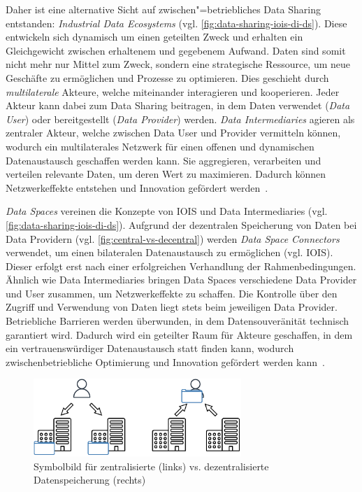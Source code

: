 Daher ist eine alternative Sicht auf zwischen"=betriebliches Data Sharing entstanden: \emph{Industrial Data Ecosystems} (vgl. \autoref{fig:data-sharing-iois-di-ds}).
Diese entwickeln sich dynamisch um einen geteilten Zweck und erhalten ein Gleichgewicht zwischen erhaltenem und gegebenem Aufwand.
Daten sind somit nicht mehr nur Mittel zum Zweck, sondern eine strategische Ressource, um neue Geschäfte zu ermöglichen und Prozesse zu optimieren.
Dies geschieht durch \emph{multilaterale} Akteure, welche miteinander interagieren und kooperieren.
Jeder Akteur kann dabei zum Data Sharing beitragen, in dem Daten verwendet (\emph{Data User}) oder bereitgestellt (\emph{Data Provider}) werden.
\emph{Data Intermediaries} agieren als zentraler Akteur, welche zwischen Data User und Provider vermitteln können, wodurch ein  multilaterales Netzwerk für einen offenen und dynamischen Datenaustausch geschaffen werden kann.
Sie aggregieren, verarbeiten und verteilen relevante Daten, um deren Wert zu maximieren.
Dadurch können Netzwerkeffekte entstehen und Innovation gefördert werden~\cite{mollerIndustrialDataEcosystems2024}.

\emph{Data Spaces} vereinen die Konzepte von IOIS und Data Intermediaries (vgl. \autoref{fig:data-sharing-iois-di-ds}).
Aufgrund der dezentralen Speicherung von Daten bei Data Providern (vgl. \autoref{fig:central-vs-decentral}) werden \emph{Data Space Connectors} verwendet, um einen bilateralen Datenaustausch zu ermöglichen (vgl. IOIS).
Dieser erfolgt erst nach einer erfolgreichen Verhandlung der Rahmenbedingungen.
Ähnlich wie Data Intermediaries bringen Data Spaces verschiedene Data Provider und User zusammen, um Netzwerkeffekte zu schaffen.
Die Kontrolle über den Zugriff und Verwendung von Daten liegt stets beim jeweiligen Data Provider.
Betriebliche Barrieren werden überwunden, in dem Datensouveränität technisch garantiert wird.
Dadurch wird ein geteilter Raum für Akteure geschaffen, in dem ein vertrauenswürdiger Datenaustausch statt finden kann, wodurch zwischenbetriebliche Optimierung und Innovation gefördert werden kann~\cite{mollerIndustrialDataEcosystems2024}.

\begin{figure}[b]
    \includegraphics[width=0.7\textwidth]{./assets/central_vs_decentral.drawio.pdf}
    \caption{Symbolbild für zentralisierte (links) vs. dezentralisierte Datenspeicherung (rechts)}
    \label{fig:central-vs-decentral}
\end{figure}

